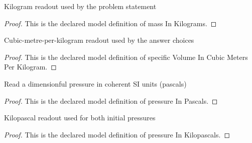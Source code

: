 \begin{definition}
  \label{def:physics:phyx-mini-0439:phyxminiproblems-problemphyxmini0439-massinkilograms}
  Kilogram readout used by the problem statement
\end{definition}
\begin{proof}
  This is the declared model definition of mass In Kilograms.
\end{proof}
\begin{definition}
  \label{def:physics:phyx-mini-0439:phyxminiproblems-problemphyxmini0439-specificvolumeincubicmetersperkilogram}
  Cubic-metre-per-kilogram readout used by the answer choices
\end{definition}
\begin{proof}
  This is the declared model definition of specific Volume In Cubic Meters Per Kilogram.
\end{proof}
\begin{definition}
  \label{def:physics:phyx-mini-0439:phyxminiproblems-problemphyxmini0439-pressureinpascals}
  Read a dimensionful pressure in coherent SI units (pascals)
\end{definition}
\begin{proof}
  This is the declared model definition of pressure In Pascals.
\end{proof}
\begin{definition}
  \label{def:physics:phyx-mini-0439:phyxminiproblems-problemphyxmini0439-pressureinkilopascals}
  Kilopascal readout used for both initial pressures
\end{definition}
\begin{proof}
  This is the declared model definition of pressure In Kilopascals.
\end{proof}
